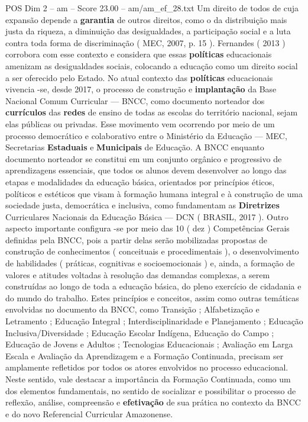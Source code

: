 \begin{textsample}{POS Dim 2 – am – Score 23.00 – am/am\_ef\_28.txt}
Um direito de todos de cuja expansão depende a \textbf{garantia} de outros direitos, como o da distribuição mais justa da riqueza, a diminuição das desigualdades, a participação social e a luta contra toda forma de discriminação ( MEC, 2007, p. 15 ).
Fernandes ( 2013 ) corrobora com esse contexto e considera que essas \textbf{políticas} educacionais amenizam as desigualdades sociais, colocando a educação como um direito social a ser oferecido pelo Estado.
No atual contexto das \textbf{políticas} educacionais vivencia -se, desde 2017, o processo de construção e \textbf{implantação} da Base Nacional Comum Curricular — BNCC, como documento norteador dos \textbf{currículos} das \textbf{redes} de ensino de todas as escolas do território nacional, sejam elas públicas ou privadas.
Esse movimento vem ocorrendo por meio de um processo democrático e colaborativo entre o Ministério da Educação — MEC, Secretarias \textbf{Estaduais} e \textbf{Municipais} de Educação.
A BNCC enquanto documento norteador se constitui em um conjunto orgânico e progressivo de aprendizagens essenciais, que todos os alunos devem desenvolver ao longo das etapas e modalidades da educação básica, orientados por princípios éticos, políticos e estéticos que visam à formação humana integral e à construção de uma sociedade justa, democrática e inclusiva, como fundamentam as \textbf{Diretrizes} Curriculares Nacionais da Educação Básica — DCN ( BRASIL, 2017 ).
Outro aspecto importante configura -se por meio das 10 ( dez ) Competências Gerais definidas pela BNCC, pois a partir delas serão mobilizadas propostas de construção de conhecimentos ( conceituais e procedimentais ), o desenvolvimento de habilidades ( práticas, cognitivas e socioemocionais ) e, ainda, a formação de valores e atitudes voltadas à resolução das demandas complexas, a serem construídas ao longo de toda a educação básica, do pleno exercício de cidadania e do mundo do trabalho.
Estes princípios e conceitos, assim como outras temáticas envolvidas no documento da BNCC, como Transição ; Alfabetização e Letramento ; Educação Integral ; Interdisciplinaridade e Planejamento ; Educação Inclusiva/Diversidade ; Educação Escolar Indígena, Educação do Campo ; Educação de Jovens e Adultos ; Tecnologias Educacionais ; Avaliação em Larga Escala e Avaliação da Aprendizagem e a Formação Continuada, precisam ser amplamente refletidos por todos os atores envolvidos no processo educacional.
Neste sentido, vale destacar a importância da Formação Continuada, como um dos elementos fundamentais, no sentido de socializar e possibilitar o processo de reflexão, análise, compreensão e \textbf{efetivação} de sua prática no contexto da BNCC e do novo Referencial Curricular Amazonense.

\end{textsample}
